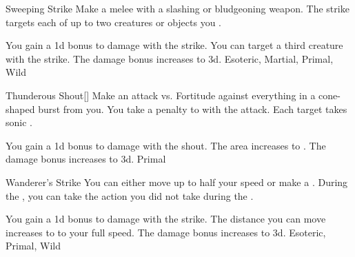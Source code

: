 \lowercase{\hypertarget{maneuver:Sweeping Strike}{}}\label{maneuver:Sweeping Strike}
\hypertarget{maneuver:Sweeping Strike}{}
\begin{freeability}{Sweeping Strike}
Make a melee  with a slashing or bludgeoning weapon.
The strike targets each of up to two creatures or objects you .

\rankline
{} You gain a \plus1d bonus to damage with the strike.
 You can target a third creature with the strike.
 The damage bonus increases to \plus3d.
 Esoteric, Martial, Primal, Wild
\end{freeability}
\vspace{0.25em}



\lowercase{\hypertarget{maneuver:Thunderous Shout}{}}\label{maneuver:Thunderous Shout}
\hypertarget{maneuver:Thunderous Shout}{}
\begin{freeability}{Thunderous Shout}[]
Make an attack vs. Fortitude against everything in a \areamed cone-shaped burst from you.
You take a  penalty to  with the attack.
\hit Each target takes sonic .

\rankline
{} You gain a \plus1d bonus to damage with the shout.
 The area increases to \arealarge.
 The damage bonus increases to \plus3d.
 Primal
\end{freeability}
\vspace{0.25em}



\lowercase{\hypertarget{maneuver:Wanderer's Strike}{}}\label{maneuver:Wanderer's Strike}
\hypertarget{maneuver:Wanderer's Strike}{}
\begin{freeability}{Wanderer's Strike}
You can either move up to half your speed or make a .
During the , you can take the action you did not take during the .

\rankline
{} You gain a \plus1d bonus to damage with the strike.
 The distance you can move increases to to your full speed.
 The damage bonus increases to \plus3d.
 Esoteric, Primal, Wild
\end{freeability}
\vspace{0.25em}




